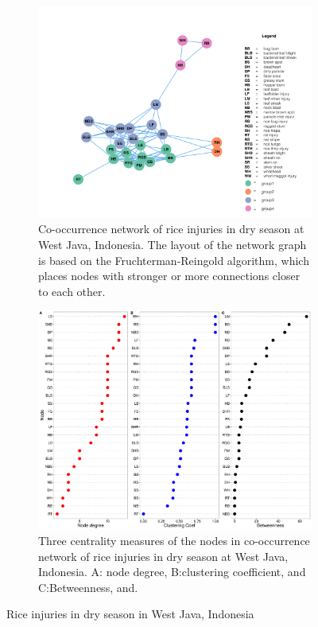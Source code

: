 \begin{figure}
    \centering
    \begin{subfigure}[b]{1\textwidth}
        \includegraphics[width = 1\textwidth]{figures/networkWJ_ds/networkWJ_ds.pdf}
        \caption{Co-occurrence network of rice injuries in dry season at West Java, Indonesia. The layout of the network graph is based on the Fruchterman-Reingold algorithm, which places nodes with stronger or more connections closer to each other.}
        \label{fig:networkWJ_ds}
    \end{subfigure}
    \begin{subfigure}[b]{1\textwidth}
        \includegraphics[width = 1\textwidth]{figures/nodepropWJ_ds/nodepropWJ_ds.pdf}
        \caption{Three centrality measures of the nodes in co-occurrence network of rice injuries in dry season at West Java, Indonesia. A: node degree, B:clustering coefficient, and C:Betweenness, and.}
        \label{fig:nodepropWJ_ds}
    \end{subfigure}
    \caption{Rice injuries in dry season in West Java, Indonesia}
    \label{fig:WJ_ds}
\end{figure}

